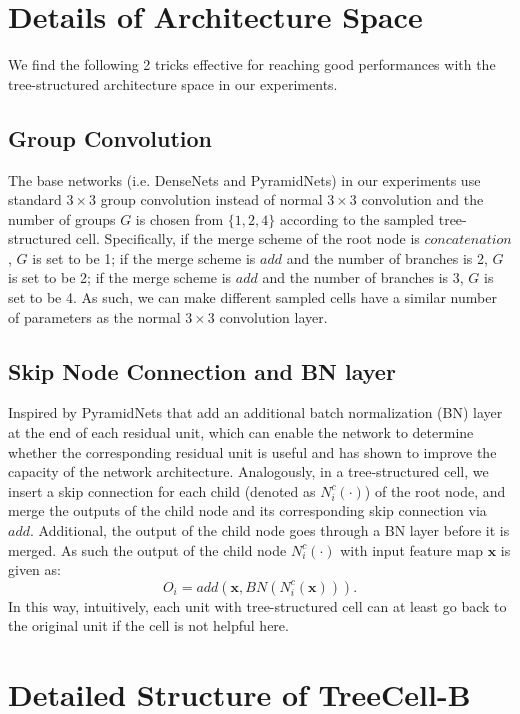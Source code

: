 \documentclass{article}
\newcommand{\bs}{\boldsymbol}
\newcommand{\bx}{\bs{x}}
\begin{document}
\section{Details of Architecture Space}
We find the following 2 tricks effective for reaching good performances with the tree-structured architecture space in our experiments. 

\subsection{Group Convolution} 
The base networks (i.e. DenseNets and PyramidNets) in our experiments use standard $3 \times 3$ group convolution instead of normal $3 \times 3$ convolution and the number of groups $G$ is chosen from $\{1, 2, 4\}$ according to the sampled tree-structured cell. Specifically, if the merge scheme of the root node is $concatenation$, $G$ is set to be 1; if the merge scheme is $add$ and the number of branches is 2, $G$ is set to be 2; if the merge scheme is $add$ and the number of branches is 3, $G$ is set to be 4. As such, we can make different sampled cells have a similar number of parameters as the normal $3 \times 3$ convolution layer. 

\subsection{Skip Node Connection and BN layer}
Inspired by PyramidNets \cite{han2016deep} that add an additional batch normalization (BN) \cite{ioffe2015batch} layer at the end of each residual unit, which can enable the network to determine whether the corresponding residual unit is useful and has shown to improve the capacity of the network architecture. Analogously, in a tree-structured cell, we insert a skip connection for each child (denoted as $N^c_i (\cdot)$) of the root node, and merge the outputs of the child node and its corresponding skip connection via $add$. Additional, the output of the child node goes through a BN layer before it is merged. As such the output of the child node $N^c_i (\cdot)$ with input feature map $\bx$ is given as:
\begin{equation}
    O_i = add(\bx, BN(N^c_i(\bx))).
\end{equation}
In this way, intuitively, each unit with tree-structured cell can at least go back to the original unit if the cell is not helpful here. 

\section{Detailed Structure of TreeCell-B}
\end{document}
